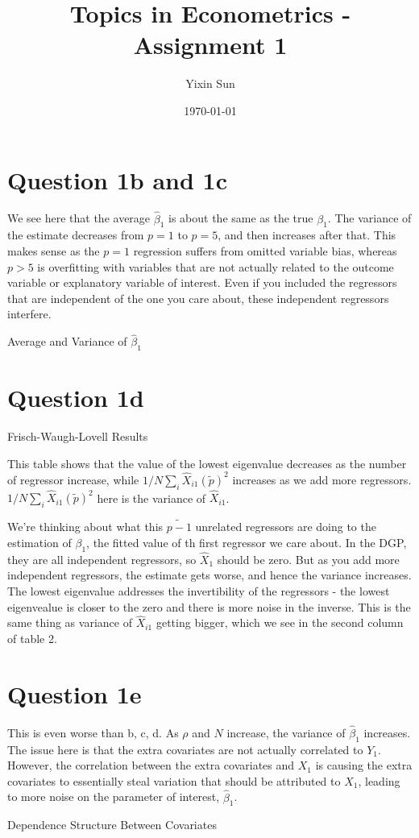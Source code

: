 \documentclass[reqno,12pt,notitlepage]{article}
\title{Topics in Econometrics - Assignment 1}
\author{Yixin Sun}
\date{\today}
\begin{document}
\maketitle

\section*{Question 1b and 1c}
We see here that the average $\hat{\beta}_{1}$ is about the same as the true $\beta_1$. The variance of the estimate decreases from $p =1$ to $p = 5$, and then increases after that. This makes sense as the $p=1$ regression suffers from omitted variable bias, whereas $p >5$ is overfitting with variables that are not actually related to the outcome variable or explanatory variable of interest. Even if you included the regressors that are independent of the one you care about, these independent regressors interfere. 

\begin{table}[H]
    \centering
    \caption{Average and Variance of $\hat{\beta}_1$}
    
\end{table}


\section*{Question 1d}
\begin{table}[H]
    \centering
    \caption{Frisch-Waugh-Lovell Results}
    
\end{table}
This table shows that the value of the lowest eigenvalue decreases as the number of regressor increase, while $1 / N \sum_{i} \hat{X}_{i 1}(\tilde{p})^{2}$ increases as we add more regressors. $1 / N \sum_{i} \hat{X}_{i 1}(\tilde{p})^{2}$ here is the variance of $\hat{X}_{i 1}$. 


We're thinking about what this $\tilde{p-1}$ unrelated regressors are doing to the estimation of $\beta_1$, the fitted value of th first regressor we care about. In the DGP, they are all independent regressors, so $\hat{X}_{1}$ should be zero. But as you add more independent regressors, the estimate gets worse, and hence the variance increases. The lowest eigenvalue addresses the invertibility of the regressors - the lowest eigenvealue is closer to the zero and there is more noise in the inverse. This is the same thing as variance of $\hat{X}_{i 1}$ getting bigger, which we see in the second column of table 2. 


\section*{Question 1e}
This is even worse than b, c, d. As $\rho$ and $N$ increase, the variance of $\hat{\beta}_1$ increases. The issue here is that the extra covariates are not actually correlated to $Y_1$. However, the correlation between the extra covariates and $X_1$ is causing the extra covariates to essentially steal variation that should be attributed to $X_1$, leading to more noise on the parameter of interest, $\hat{\beta}_1$.
\begin{table}[H]
    \centering
    \caption{Dependence Structure Between Covariates}
    
\end{table}
\end{document}
